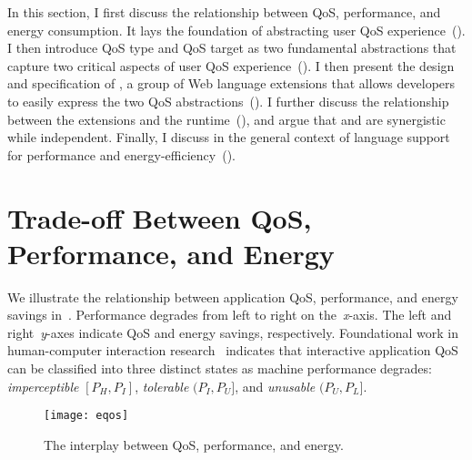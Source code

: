 In this section, I first discuss the relationship between QoS, performance, and energy consumption. It lays the foundation of abstracting user QoS experience~(). I then introduce QoS type and QoS target as two fundamental abstractions that capture two critical aspects of user QoS experience~(). I then present the design and specification of \greenweb, a group of Web language extensions that allows developers to easily express the two QoS abstractions~(). I further discuss the relationship between the \greenweb extensions and the \webrt runtime~(), and argue that \greenweb and \webrt are synergistic while independent. Finally, I discuss \greenweb in the general context of language support for performance and energy-efficiency~().

\section{Trade-off Between QoS, Performance, and Energy}
\label{sec:lang:eqos}

We illustrate the relationship between application QoS, performance, and energy savings in~. Performance degrades from left to right on the~\textit{x}-axis. The left and right~\textit{y}-axes indicate QoS and energy savings, respectively. Foundational work in human-computer interaction research~\cite{eventlatency, designUI, info_vis, response_time, percent_done, usability_engineering} indicates that interactive application QoS can be classified into three distinct states as machine performance degrades: \textit{imperceptible} $[P_H,P_I]$, \textit{tolerable} $(P_I,P_U]$, and \textit{unusable} $(P_U,P_L]$.

\begin{figure}[h]
\centering
\captionsetup{width=.7\columnwidth}
\texttt{[image: eqos]}
\caption{\small{The interplay between QoS, performance, and energy.}}
\label{fig:eqos}
\end{figure}

